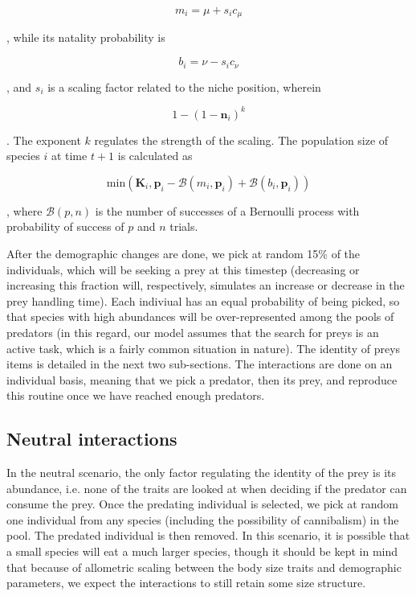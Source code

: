 \documentclass[10pt,twocolumn,fleqn]{article}
\begin{document}
\begin{equation}
	m_i = \mu+s_ic_\mu
\end{equation}

\noindent, while its natality probability is 

\begin{equation}
	b_i = \nu-s_ic_\nu
\end{equation}

\noindent, and $s_i$ is a scaling factor related to the niche position, wherein

\begin{equation}
	1-(1-\mathbf{n}_i)^k
\end{equation}

\noindent. The exponent $k$ regulates the strength of the scaling. The
population size of species $i$ at time $t+1$ is calculated as

\begin{equation}
	\mathrm{min}(\mathbf{K}_i, \mathbf{p}_i - \mathcal{B}(m_i, \mathbf{p}_i) + \mathcal{B}(b_i, \mathbf{p}_i))
\end{equation}

\noindent, where $\mathcal{B}(p,n)$ is the number of successes of a Bernoulli
process with probability of success of $p$ and $n$ trials.

After the demographic changes are done, we pick at random 15\% of the
individuals, which will be seeking a prey at this timestep (decreasing or
increasing this fraction will, respectively, simulates an increase or decrease
in the prey handling time). Each indiviual has an equal probability of being
picked, so that species with high abundances will be over-represented among the
pools of predators (in this regard, our model assumes that the search for preys
is an active task, which is a fairly common situation in nature). The identity
of preys items is detailed in the next two sub-sections. The interactions are
done on an individual basis, meaning that we pick a predator, then its prey, and
reproduce this routine once we have reached enough predators.

\subsection{Neutral interactions}

In the neutral scenario, the only factor regulating the identity of the prey
is its abundance, i.e. none of the traits are looked at when deciding if the
predator can consume the prey. Once the predating individual is selected, we pick at random
one individual from any species (including the possibility of cannibalism) in
the pool. The predated individual is then removed. In this scenario, it is
possible that a small species will eat a much larger species, though it should
be kept in mind that because of allometric scaling between the body size traits
and demographic parameters, we expect the interactions to still retain some size
structure.
\end{document}
